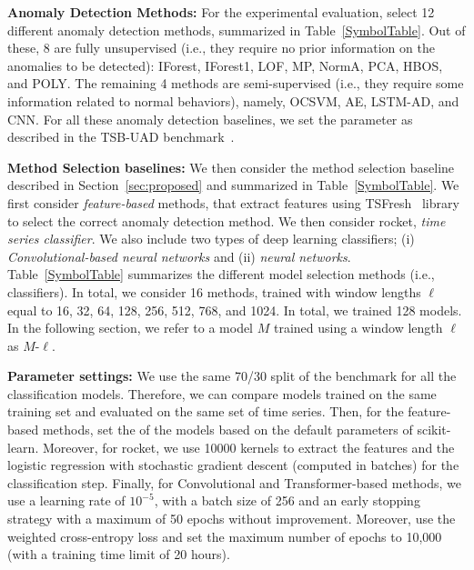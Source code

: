\noindent \textbf{Anomaly Detection Methods: }
For the experimental evaluation,  select 12 different anomaly detection methods, summarized in Table~\ref{SymbolTable}. Out of these, 8 are fully unsupervised (i.e., they require no prior information on the anomalies to be detected): IForest, IForest1, LOF, MP, NormA, PCA, HBOS, and POLY. The remaining 4 methods are semi-supervised (i.e., they require some information related to normal behaviors), namely, OCSVM, AE, LSTM-AD, and CNN. For all these anomaly detection baselines, we set the parameter as described in the TSB-UAD benchmark~\cite{10.14778/3529337.3529354}.

\noindent \textbf{Method Selection baselines: }
We then consider the method selection baseline described in Section~\ref{sec:proposed} and summarized in Table~\ref{SymbolTable}. We first consider {\it feature-based} methods, that extract features using TSFresh~\cite{CHRIST201872} library to select the correct anomaly detection method. We then consider rocket,  {\it time series classifier}. We also include two types of deep learning classifiers; (i) {\it Convolutional-based neural networks} and (ii) {\it {} neural networks}. Table~\ref{SymbolTable} summarizes the different model selection methods (i.e., classifiers). In total, we consider 16 methods, trained with window lengths $\ell$ equal to 16, 32, 64, 128, 256, 512, 768, and 1024. In total, we trained 128 models. In the following section, we refer to a model $M$ trained using a window length $\ell$ as $M$-$\ell$.

\noindent \textbf{Parameter settings: }
We use the same 70/30 split of the benchmark for all the classification models. Therefore, we can compare models trained on the same training set and evaluated on the same set of time series. Then, for the feature-based methods,  set the  of the models based on the default parameters of scikit-learn. 
Moreover, for rocket, we use 10000 kernels to extract the features and the logistic regression with stochastic gradient descent (computed in batches) for the classification step. Finally, for Convolutional and Transformer-based methods, we use a learning rate of $10^{-5}$, with a batch size of 256 and an early stopping strategy with a maximum of 50 epochs without improvement. Moreover,  use the weighted cross-entropy loss and set the maximum number of epochs to 10,000 (with a training time limit of 20 hours).

